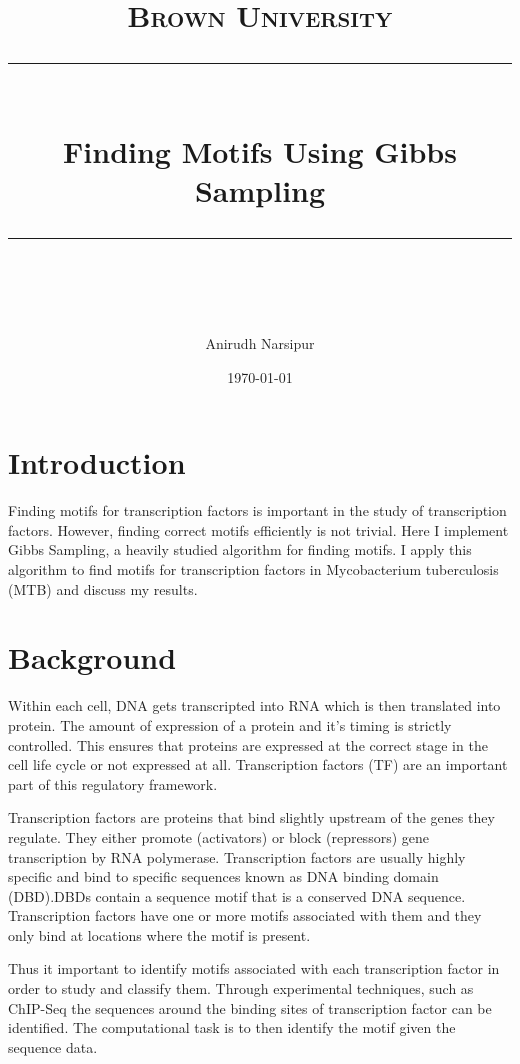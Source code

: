 \documentclass[12pt]{scrartcl} %
\title{	
	\normalfont\normalsize
	\textsc{Brown University}\\ %
	\vspace{25pt} %
	\rule{\linewidth}{0.5pt}\\ %
	\vspace{20pt} %
	{\huge Finding Motifs Using Gibbs Sampling}\\ %
	\vspace{12pt} %
	\rule{\linewidth}{2pt}\\ %
	\vspace{12pt} %
}
\author{\LARGE Anirudh Narsipur} %
\date{\normalsize\today} %
\begin{document}
\maketitle %


\section{Introduction}

Finding motifs for transcription factors is important in the study of
transcription factors. However, finding correct motifs efficiently is not trivial.
\newline \newline 
Here I implement Gibbs Sampling, a heavily studied algorithm for finding motifs. I apply this algorithm
to find motifs for transcription factors in Mycobacterium tuberculosis (MTB) and discuss my results.
\section{Background}
Within each cell, DNA gets transcripted into RNA which is then translated into
protein. The amount of expression of a protein and it's timing is strictly controlled.
This ensures that proteins are expressed at the correct stage in the cell life cycle or not expressed
at all. Transcription factors (TF) are an important part of this regulatory framework.

Transcription factors are proteins that bind slightly upstream of the genes they regulate.
They either promote (activators) or block (repressors) gene transcription by RNA polymerase.
Transcription factors are usually highly specific and bind to specific sequences known as DNA binding domain (DBD).DBDs contain
a sequence motif that is a conserved DNA sequence. Transcription factors have one or more motifs associated with them and they only bind
at locations where the motif is present. 

Thus it important to identify motifs associated with each transcription factor in order
to study and classify them. Through experimental techniques, such as ChIP-Seq the sequences around the binding sites of transcription factor
can be identified. The computational task is to then identify the motif given the sequence data.
\end{document}
